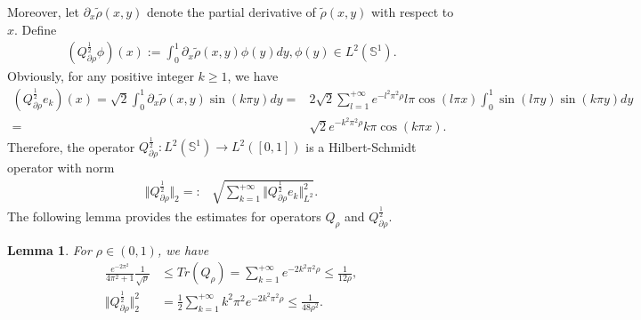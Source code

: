 \documentclass[11pt]{article}
\numberwithin{equation}{section}%
\numberwithin{figure}{section}%
\newtheorem{lemma}[theorem]{Lemma}
\theoremstyle{remark}
\begin{document}
	Moreover, let $\partial_{x}\tilde{\rho}(x,y)$ denote the partial derivative of $\tilde{\rho}(x,y)$ with respect to $x$. Define
	\begin{align}\label{eq:partialrho}
		(Q_{\partial\rho}^{\frac{1}{2}}\phi)(x):=\int_{0}^{1}\partial_{x}\tilde{\rho}(x,y)\phi(y)dy, \phi(y)\in L^{2}(\mathbb{S}^{1}).
	\end{align}
	Obviously, for any positive integer $k\geq 1$, we have
		\begin{align*}
		(Q_{\partial\rho}^{\frac{1}{2}}e_{k})(x)=\sqrt{2}\int_{0}^{1}\partial_{x}\tilde{\rho}(x,y)\sin(k\pi y)dy=&2\sqrt{2}\sum_{l=1}^{+\infty}e^{-l^{2}\pi^{2}\rho}l\pi \cos(l\pi x)\int_{0}^{1}\sin(l\pi y)\sin(k\pi y)dy\\
		=&\sqrt{2}e^{-k^{2}\pi^{2}\rho}k\pi \cos(k\pi x).
	\end{align*}
	Therefore, the operator $Q_{\partial\rho}^{\frac{1}{2}}: L^{2}(\mathbb{S}^{1})\rightarrow L^{2}([0,1])$ is a Hilbert-Schmidt operator with norm
		\begin{align*}
		\Vert Q_{\partial\rho}^{\frac{1}{2}}\Vert_{2}=:&\sqrt{\sum_{k=1}^{+\infty}\Vert Q_{\partial\rho}^{\frac{1}{2}}e_{k}\Vert^{2}_{L^{2}}}.
	\end{align*}
	The following lemma provides the estimates for operators $Q_{\rho}$ and $Q_{\partial\rho}^{\frac{1}{2}}$.
		\begin{lemma}\label{cor:trest}
				For $\rho\in(0,1)$, we have
		\begin{equation}\label{eq:trespt}
			\begin{split}
				\frac{e^{-2\pi^{2}}}{4\pi^{2}+1}\frac{1}{\sqrt{\rho}}&\leq Tr(Q_{\rho})=\sum_{k=1}^{+\infty} e^{-2k^{2}\pi^{2}\rho}\leq\frac{1}{12\rho},\\
				\Vert Q_{\partial\rho}^{\frac{1}{2}}\Vert^{2}_{2}&=\frac{1}{2}\sum_{k=1}^{+\infty} k^{2}\pi^{2}e^{-2k^{2}\pi^{2}\rho}\leq\frac{1}{48\rho^{2}}.
			\end{split}
		\end{equation}
		\end{lemma}
\end{document}
